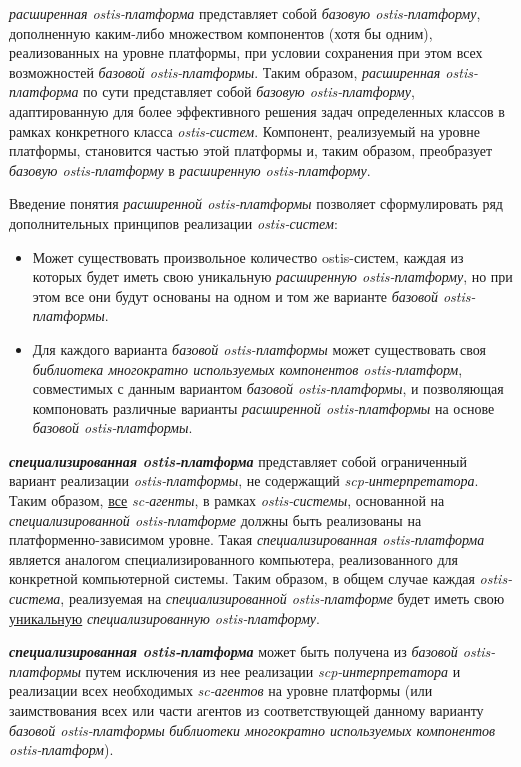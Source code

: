 \textit{расширенная ostis-платформа} представляет собой \textit{базовую ostis-платформу}, дополненную каким-либо множеством компонентов (хотя бы одним), реализованных на уровне платформы, при условии сохранения при этом всех возможностей \textit{базовой ostis-платформы}. Таким образом, \textit{расширенная ostis-платформа} по сути представляет собой \textit{базовую ostis-платформу}, адаптированную для более эффективного решения задач определенных классов в рамках конкретного класса \textit{ostis-систем}. Компонент, реализуемый на уровне платформы, становится частью этой платформы и, таким образом,  преобразует \textit{базовую ostis-платформу} в \textit{расширенную ostis-платформу}. 

Введение понятия \textit{расширенной ostis-платформы} позволяет сформулировать ряд дополнительных принципов реализации \textit{ostis-систем}:
\begin{itemize}
	\item Может существовать произвольное количество ostis-систем, каждая из которых будет иметь свою уникальную \textit{расширенную ostis-платформу}, но при этом все они будут основаны на одном и том же варианте \textit{базовой ostis-платформы}.
	\item Для каждого варианта \textit{базовой ostis-платформы} может существовать своя \textit{библиотека многократно используемых компонентов ostis-платформ}, совместимых с данным вариантом \textit{базовой ostis-платформы}, и позволяющая компоновать различные варианты \textit{расширенной ostis-платформы} на основе \textit{базовой ostis-платформы}.
\end{itemize} 

\textbf{\textit{специализированная ostis-платформа}} представляет собой ограниченный вариант реализации \textit{ostis-платформы}, не содержащий \textit{scp-интерпретатора}. Таким образом, \uline{все} \textit{sc-агенты}, в рамках \textit{ostis-системы}, основанной на \textit{специализированной ostis-платформе} должны быть реализованы на платформенно-зависимом уровне. Такая  \textit{специализированная ostis-платформа} является аналогом специализированного компьютера, реализованного для конкретной компьютерной системы. Таким образом, в общем случае каждая \textit{ostis-система}, реализуемая на \textit{специализированной ostis-платформе} будет иметь свою \uline{уникальную} \textit{специализированную ostis-платформу}.

\textbf{\textit{специализированная ostis-платформа}} может быть получена из \textit{базовой ostis-платформы} путем исключения из нее реализации  \textit{scp-интерпретатора} и реализации всех необходимых \textit{sc-агентов} на уровне платформы (или заимствования всех или части агентов из соответствующей данному варианту \textit{базовой ostis-платформы} \textit{библиотеки многократно используемых компонентов ostis-платформ}).

